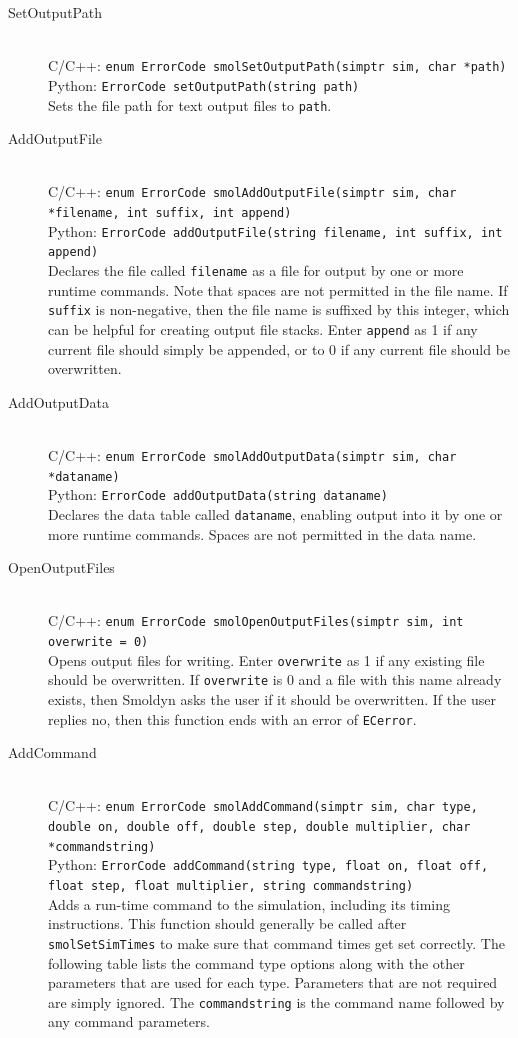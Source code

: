 \documentclass {scrbook}
\newcommand {\ttt} {\texttt}
\begin{document}
\begin{description}

\item[SetOutputPath]
\hfill \\
C/C++: \ttt{enum ErrorCode smolSetOutputPath(simptr sim, char *path)}\\
Python: \ttt{ErrorCode setOutputPath(string path)}\\
Sets the file path for text output files to \ttt{path}.

\item[AddOutputFile]
\hfill \\
C/C++: \ttt{enum ErrorCode smolAddOutputFile(simptr sim, char *filename, int suffix, int append)}\\
Python: \ttt{ErrorCode addOutputFile(string filename, int suffix, int append)}\\
Declares the file called \ttt{filename} as a file for output by one or more runtime commands. Note that spaces are not permitted in the file name. If \ttt{suffix} is non-negative, then the file name is suffixed by this integer, which can be helpful for creating output file stacks. Enter \ttt{append} as 1 if any current file should simply be appended, or to 0 if any current file should be overwritten.

\item[AddOutputData]
\hfill \\
C/C++: \ttt{enum ErrorCode smolAddOutputData(simptr sim, char *dataname)}\\
Python: \ttt{ErrorCode addOutputData(string dataname)}\\
Declares the data table called \ttt{dataname}, enabling output into it by one or more runtime commands. Spaces are not permitted in the data name.

\item[OpenOutputFiles]
\hfill \\
C/C++: \ttt{enum ErrorCode smolOpenOutputFiles(simptr sim, int overwrite = 0)}\\
Opens output files for writing. Enter \ttt{overwrite} as 1 if any existing file should be overwritten. If \ttt{overwrite} is 0 and a file with this name already exists, then Smoldyn asks the user if it should be overwritten. If the user replies no, then this function ends with an error of \ttt{ECerror}.

\item[AddCommand]
\hfill \\
C/C++: \ttt{enum ErrorCode smolAddCommand(simptr sim, char type, double on, double off, double step, double multiplier, char *commandstring)}\\
Python: \ttt{ErrorCode addCommand(string type, float on, float off, float step, float multiplier, string commandstring)}\\
Adds a run-time command to the simulation, including its timing instructions. This function should generally be called after \ttt{smolSetSimTimes} to make sure that command times get set correctly. The following table lists the command type options along with the other parameters that are used for each type. Parameters that are not required are simply ignored. The \ttt{commandstring} is the command name followed by any command parameters.


\end{description}
\end{document}
